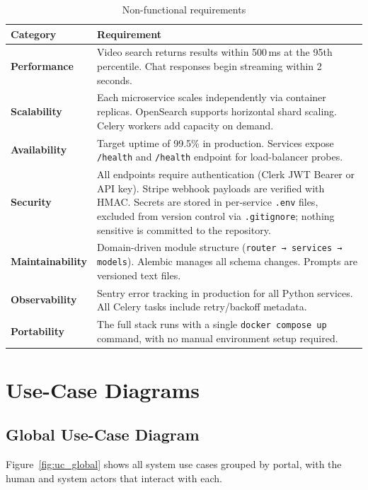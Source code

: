 \begin{table}[H]
\centering
\caption{Non-functional requirements}
\begin{tabularx}{\textwidth}{lX}
\toprule
\textbf{Category} & \textbf{Requirement} \\
\midrule
\textbf{Performance} & Video search returns results within 500\,ms at the 95th percentile.
  Chat responses begin streaming within 2 seconds. \\[0.3em]
\textbf{Scalability} & Each microservice scales independently via container replicas.
  OpenSearch supports horizontal shard scaling. Celery workers add capacity on demand. \\[0.3em]
\textbf{Availability} & Target uptime of 99.5\% in production. Services expose \texttt{/health}
  and \texttt{/health} endpoint for load-balancer probes. \\[0.3em]
\textbf{Security} & All endpoints require authentication (Clerk JWT Bearer or API key). Stripe
  webhook payloads are verified with HMAC. Secrets are stored in per-service \texttt{.env}
  files, excluded from version control via \texttt{.gitignore}; nothing sensitive is committed
  to the repository. \\[0.3em]
\textbf{Maintainability} & Domain-driven module structure (\texttt{router → services → models}).
  Alembic manages all schema changes. Prompts are versioned text files. \\[0.3em]
\textbf{Observability} & Sentry error tracking in production for all Python services.
  All Celery tasks include retry/backoff metadata. \\[0.3em]
\textbf{Portability} & The full stack runs with a single \texttt{docker compose up} command, with no manual environment setup required. \\
\bottomrule
\end{tabularx}
\end{table}

\section{Use-Case Diagrams}

\subsection{Global Use-Case Diagram}

Figure~\ref{fig:uc_global} shows all system use cases grouped by portal, with the human and
system actors that interact with each.

